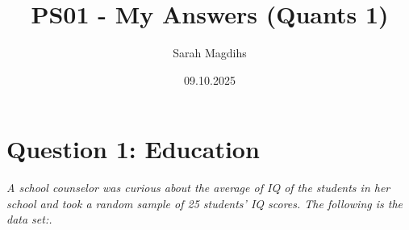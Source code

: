 \documentclass[12pt,letterpaper]{article}
\title{PS01 - My Answers (Quants 1)}
\date{09.10.2025}
\author{Sarah Magdihs}
\begin{document}
	\maketitle
	
	
	\section*{Question 1: Education }
	
	\textit{A school counselor was curious about the average of IQ of the students in her school and took a random sample of 25 students’ IQ scores. The following is the data set:.}\\
	
	  
	
	\vspace{.25cm}
	
\end{document}
